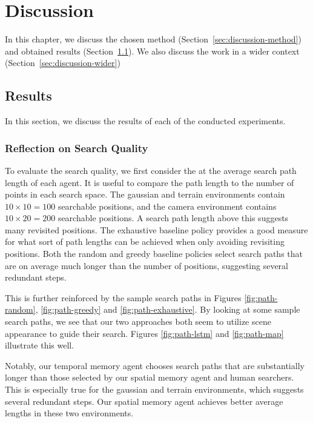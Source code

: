 \chapter{Discussion}
\label{cha:discussion}

In this chapter, we discuss the chosen method (Section~\ref{sec:discussion-method}) and obtained results (Section~\ref{sec:discussion-results}).
We also discuss the work in a wider context (Section~\ref{sec:discussion-wider})

\section{Results}
\label{sec:discussion-results}

In this section, we discuss the results of each of the conducted experiments.

\subsection{Reflection on Search Quality}

To evaluate the search quality, we first consider the at the average search path length of each agent.
It is useful to compare the path length to the number of points in each search space.
The gaussian and terrain environments contain \(10 \times 10 = 100\) searchable positions, and the camera environment contains \(10 \times 20 = 200\) searchable positions.
A search path length above this suggests many revisited positions.
The exhaustive baseline policy provides a good measure for what sort of path lengths can be achieved when only avoiding revisiting positions.
Both the random and greedy baseline policies select search paths that are on average much longer than the number of positions, suggesting several redundant steps.

This is further reinforced by the sample search paths in Figures \ref{fig:path-random}, \ref{fig:path-greedy} and \ref{fig:path-exhaustive}.
By looking at some sample search paths, we see that our two approaches both seem to utilize scene appearance to guide their search.
Figures \ref{fig:path-lstm} and \ref{fig:path-map} illustrate this well.

Notably, our temporal memory agent chooses search paths that are substantially longer than those selected by our spatial memory agent and human searchers.
This is especially true for the gaussian and terrain environments, which suggests several redundant steps.
Our spatial memory agent achieves better average lengths in these two environments.


